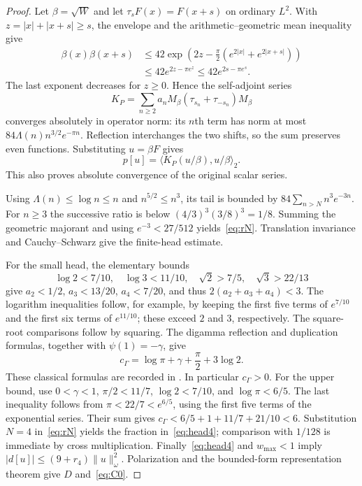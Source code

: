 \documentclass[11pt,a4paper]{article}
\numberwithin{equation}{section}
\theoremstyle{remark}
\newcommand{\cg}{c_{\Gamma}}
\newcommand{\ip}[2]{\langle #1,#2\rangle}
\newcommand{\norm}[1]{\lVert #1\rVert}
\begin{document}
\begin{proof}
Let $\beta=\sqrt W$ and let $\tau_sF(x)=F(x+s)$ on ordinary $L^2$. With $z=|x|+|x+s|\ge s$, the envelope and the arithmetic--geometric mean inequality give
\begin{align*}
 \beta(x)\beta(x+s)
 &\le42\exp\left(2z-\frac\pi2(e^{2|x|}+e^{2|x+s|})\right)\\
 &\le42e^{2z-\pi e^z}\le42e^{2s-\pi e^s}.
\end{align*}
The last exponent decreases for $z\ge0$. Hence the self-adjoint series
\begin{equation}\label{eq:KP}
 K_P=\sum_{n\ge2}a_nM_\beta(\tau_{s_n}+\tau_{-s_n})M_\beta
\end{equation}
converges absolutely in operator norm: its $n$th term has norm at most
$84\Lambda(n)n^{3/2}e^{-\pi n}$.
Reflection interchanges the two shifts, so the sum preserves even functions. Substituting $u=\beta F$ gives
\begin{equation}\label{eq:prepresentation}
 p[u]=\ip{K_P(u/\beta)}{u/\beta}_2.
\end{equation}
This also proves absolute convergence of the original scalar series.

Using $\Lambda(n)\le\log n\le n$ and $n^{5/2}\le n^3$, its tail is bounded by
$84\sum_{n>N}n^3e^{-3n}$. For $n\ge3$ the successive ratio is below
$(4/3)^3(3/8)^3=1/8$. Summing the geometric majorant and using
$e^{-3}<27/512$ yields~\eqref{eq:rN}. Translation invariance and Cauchy--Schwarz give the finite-head estimate.

For the small head, the elementary bounds
\[
 \log2<7/10,\quad \log3<11/10,\quad
 \sqrt2>7/5,\quad \sqrt3>22/13
\]
give $a_2<1/2$, $a_3<13/20$, $a_4<7/20$, and thus
$2(a_2+a_3+a_4)<3$. The logarithm inequalities follow, for example, by keeping the first five terms of $e^{7/10}$ and the first six terms of $e^{11/10}$; these exceed $2$ and $3$, respectively. The square-root comparisons follow by squaring.
The digamma reflection and duplication formulas, together with $\psi(1)=-\gamma$, give
\[
 \cg=\log\pi+\gamma+\frac\pi2+3\log2.
\]
These classical formulas are recorded in \cite[Sections 5.4--5.5]{DLMF}. In particular $\cg>0$. For the upper bound, use $0<\gamma<1$, $\pi/2<11/7$, $\log2<7/10$, and $\log\pi<6/5$. The last inequality follows from $\pi<22/7<e^{6/5}$, using the first five terms of the exponential series. Their sum gives
$\cg<6/5+1+11/7+21/10<6$.
Substitution $N=4$ in~\eqref{eq:rN} yields the fraction in~\eqref{eq:head4}; comparison with $1/128$ is immediate by cross multiplication.
Finally~\eqref{eq:head4} and $w_{\max}<1$ imply
$|d[u]|\le(9+r_4)\norm u_\omega^2$. Polarization and the bounded-form representation theorem give $D$ and~\eqref{eq:C0}.
\end{proof}
\end{document}
